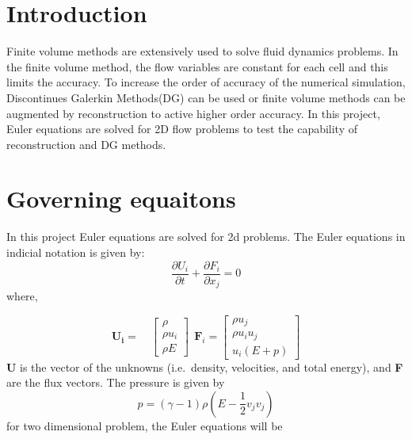 \documentclass[12pt]{elsarticle}
\begin{document}
	\section{Introduction}
	Finite volume methods are extensively used to solve fluid dynamics problems. In the finite volume method, the flow variables are constant for each cell and this limits the accuracy. To increase the order of accuracy of the numerical simulation, Discontinues Galerkin Methods(DG) can be used or finite volume methods can be augmented by reconstruction to active higher order accuracy. In this project, Euler equations are solved for 2D flow problems to test the capability of reconstruction and DG methods.\newline
	\newline
	
	\section{Governing equaitons}
	In this project Euler equations are solved for 2d problems. The Euler equations in indicial notation is given by:
	\begin{equation}\label{indiequ}
		\frac{\partial U_i}{\partial t}+\frac{\partial F_i}{\partial x_j}=0
	\end{equation}
	where,
	
	$$
	\mathbf{U_i} =
	\quad
	\begin{bmatrix}
		\rho \\
		\rho u_i \\
		\rho E \end{bmatrix}
	\
	\
	\mathbf{F}_i = \begin{bmatrix}
		\rho u_j\\
		\rho u_iu_j \\
		u_i (E+p)
	\end{bmatrix}
	$$
	\textbf{U} is the vector of the unknowns (i.e.\ density, velocities, and total energy), and \textbf{F} are the flux vectors. The pressure is given by
	\begin{equation}
		p=(\gamma-1)\rho(E-\frac{1}{2}v_jv_j) 
	\end{equation}
	for two dimensional problem, the Euler equations will be 
	
\end{document}
